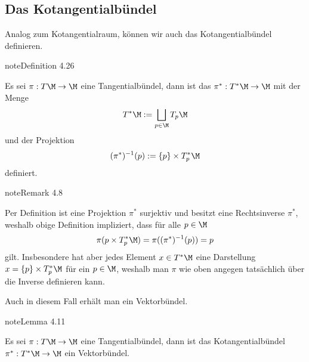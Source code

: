 \documentclass[letterpaper,10pt,english]{jupyterBook}
\begin{document}
\subsection{Das Kotangentialbündel}
\label{\detokenize{manifolds/tangential:das-kotangentialbundel}}\label{\detokenize{manifolds/tangential:s-kotangbundel}}
\sphinxAtStartPar
Analog zum Kotangentialraum, können wir auch das Kotangentialbündel definieren.
\label{manifolds/tangential:definition-34}
\begin{sphinxadmonition}{note}{Definition 4.26}



\sphinxAtStartPar
Es sei \(\pi:T\M\to\M\) eine Tangentialbündel, dann ist das  \(\pi^\ast: T^\ast\M\to\M\) mit der Menge
\begin{equation*}
\begin{split}T^\ast\M := \bigsqcup_{p\in\M} T_p\M\end{split}
\end{equation*}
\sphinxAtStartPar
und der Projektion
\begin{equation*}
\begin{split}(\pi^{\ast})^{-1}(p):= \{p\}\times T_p^\ast\M\end{split}
\end{equation*}
\sphinxAtStartPar
definiert.
\end{sphinxadmonition}
\label{manifolds/tangential:remark-35}
\begin{sphinxadmonition}{note}{Remark 4.8}



\sphinxAtStartPar
Per Definition ist eine Projektion \(\pi^\ast\) surjektiv und besitzt eine Rechtsinverse \(\pi^\ast\), weshalb obige Definition impliziert, dass für alle \(p\in\M\)
\begin{equation*}
\begin{split}\pi({p}\times T_p^\ast\M) = \pi((\pi^{\ast})^{-1}(p)) = p\end{split}
\end{equation*}
\sphinxAtStartPar
gilt. Insbesondere hat aber jedes Element \(x\in T^\ast\M\) eine Darstellung \(x=\{p\}\times T_p^\ast\M\) für ein \(p\in\M\), weshalb man \(\pi\) wie oben angegen tatsächlich über die Inverse definieren kann.
\end{sphinxadmonition}

\sphinxAtStartPar
Auch in diesem Fall erhält man ein Vektorbündel.
\label{manifolds/tangential:lemma-36}
\begin{sphinxadmonition}{note}{Lemma 4.11}



\sphinxAtStartPar
Es sei \(\pi:T\M\to\M\) eine Tangentialbündel, dann ist das Kotangentialbündel \(\pi^\ast:T^\ast\M\to\M\) ein Vektorbündel.
\end{sphinxadmonition}
\end{document}
